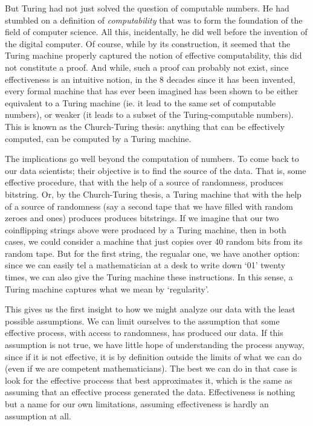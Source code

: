 But Turing had not just solved the question of computable numbers. He had stumbled on a definition of \emph{computability} that was to form the foundation of the field of computer science. All this, incidentally, he did well before the invention of the digital computer. Of course, while by its construction, it seemed that the Turing machine properly captured the notion of effective computability, this did not constitute a proof. And while, such a proof can probably not exist, since effectiveness is an intuitive notion, in the 8 decades since it has been invented, every formal machine that has ever been imagined has been shown to be either equivalent to a Turing machine (ie. it lead to the same set of computable numbers), or weaker (it leads to a subset of the Turing-computable numbers). This is known as the Church-Turing thesis: anything that can be effectively computed, can be computed by a Turing machine. 


The implications go well beyond the computation of numbers. To come back to our data scientists; their objective is to find the source of the data. That is, some effective procedure, that with the help of a source of randomness, produces bitstring. Or, by the Church-Turing thesis, a Turing machine that with the help of a source of randomness (say a second tape that we have filled with random zeroes and ones) produces produces bitstrings. If we imagine that our two coinflipping strings above were produced by a Turing machine, then in both cases, we could consider a machine that just copies over 40 random bits from its random tape. But for the first string, the regualar one, we have another option: since we can easily tel a mathematician at a desk to write down `01' twenty times, we can also give the Turing machine these instructions. In this sense, a Turing machine captures what we mean by `regularity'. 

This gives us the first insight to how we might analyze our data with the least possible assumptions. We can limit ourselves to the assumption that some effective process, with access to randomness, has produced our data. If this assumption is not true, we have little hope of understanding the process anyway, since if it is not effective, it is by definition outside the limits of what we can do (even if we are competent mathematicians). The best we can do in that case is look for the effective proccess that best approximates it, which is the same as assuming that an effective process generated the data. Effectiveness is nothing but a name for our own limitations, assuming effectiveness is hardly an assumption at all.

